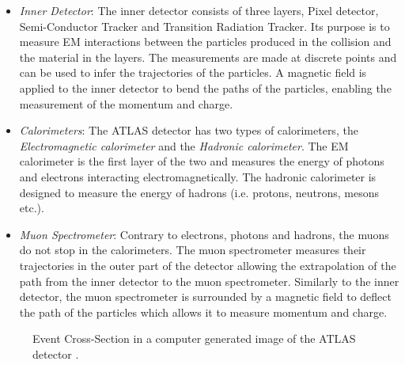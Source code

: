 \begin{itemize}
    \item \emph{Inner Detector}: The inner detector consists of three layers, Pixel detector, Semi-Conductor Tracker 
          and Transition Radiation Tracker. Its purpose is to measure \ac{EM} interactions between the particles 
          produced in the collision and the material in the layers. The measurements are made at discrete points and can be 
          used to infer the trajectories of the particles. A magnetic field is applied to the inner detector
          to bend the paths of the particles, enabling the measurement of the momentum and charge.  
    \item \emph{Calorimeters}: The \ac{ATLAS} detector has two types of calorimeters, the \emph{Electromagnetic calorimeter} and the 
           \emph{Hadronic calorimeter}. The \ac{EM} calorimeter is the first layer of the two and measures the energy of 
           photons and electrons interacting electromagnetically. The hadronic calorimeter is designed to measure the energy of 
           hadrons (i.e. protons, neutrons, mesons etc.).
    \item \emph{Muon Spectrometer}: Contrary to electrons, photons and hadrons, the muons do not stop in the calorimeters.
            The muon spectrometer measures their trajectories in the outer part of the detector allowing the extrapolation of
            the path from the inner detector to the muon spectrometer. Similarly to the inner detector, the muon spectrometer 
            is surrounded by a magnetic field to deflect the path of the particles which allows it to measure momentum and charge. 
\end{itemize}
\begin{figure}
    \centering
    \caption[Event Cross Section in a computer generated image of the
    \acs{ATLAS} detector.]{Event Cross-Section in a computer generated image of the
    ATLAS detector \cite{PDetector}.}
    \label{fig:detector}
\end{figure}

